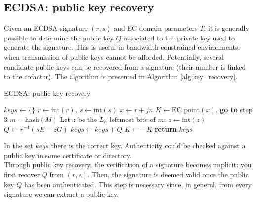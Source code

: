 \bigskip

\subsection{ECDSA: public key recovery}
Given an ECDSA signature $(r, s)$ and EC domain parameters $T$, it is generally possible to determine the public key $Q$ associated to the private key used to generate the signature. This is useful in bandwidth constrained environments, when transmission of public keys cannot be afforded. Potentially, several candidate public keys can be recovered from a signature (their number is linked to the cofactor). The algorithm is presented in Algorithm \ref{alg:key_recovery}.

\begin{algorithm}
	\caption{ECDSA: public key recovery}
	\label{alg:key_recovery}
	\begin{algorithmic}[1]
		\State $keys \gets \{\}$
		\State $r \gets \text{int}(r), \ s \gets \text{int}(s)$
		\State $x \gets r + jn$
		\State $K \gets \text{EC\_point}(x)$. 
		\State \textbf{go to} step 3
		\EndIf
		\State $m = \text{hash}(M)$
		\State Let $z$ be the $L_n$ leftmost bits of $m$: $z \gets \text{int}(z)$
		\State $Q \gets r^{-1}(sK - zG)$
		\State $keys \gets keys + Q$
		\State $K \gets -K$
		\EndFor
		\EndFor
		\State \textbf{return} $keys$
		\EndProcedure
	\end{algorithmic}
\end{algorithm}
\noindent
In the set $keys$ there is the correct key. Authenticity could be checked against a public key in some certificate or directory.
\\
Through public key recovery, the verification of a signature becomes implicit: you first recover $Q$ from $(r, s)$. Then, the signature is deemed valid once the public key $Q$ has been authenticated. This step is necessary since, in general, from every signature we can extract a public key.

\bigskip

\bigskip

